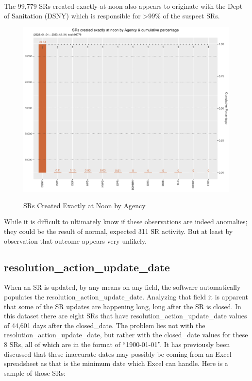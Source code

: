 \documentclass[12pt, titlepage]{article}
\begin{document}
{	The 99,779 SRs created-exactly-at-noon also appears to originate with the Dept of Sanitation (DSNY) which
	is responsible for \textgreater{}99\% of the suspect SRs.
	
	\begin{figure}[tbp]
		 \centering
		 \caption{SRs Created Exactly at Noon by Agency}
		 \includegraphics[width = \textwidth]{created_at_noon_chart.pdf}
		 \label{fig:noon-created}
	\end{figure}		
		
	While it is difficult to ultimately know if these observations are indeed anomalies; they could be the result of normal, expected
	311 SR activity. But at least by observation that outcome appears very unlikely.	
		
	\subsection{resolution\_action\_update\_date}
	When an SR is updated, by any means on any field, the software automatically populates the resolution\_action\_update\_date. Analyzing that field
	it is apparent that some of the SR updates are happening long, long after the SR is closed. In this dataset there are eight SRs that have 
	resolution\_action\_update\_date values of 44,601 days after the closed\_date. The problem lies not with the resolution\_action\_update\_date, but
	rather with the closed\_date values for these 8 SRs, all of which are in the format of ``1900-01-01''. It has previously been discussed that these
	inaccurate dates may possibly be coming from an Excel spreadsheet as that is the minimum date which Excel can handle. Here is a sample
	of those SRs:

}
\end{document}
